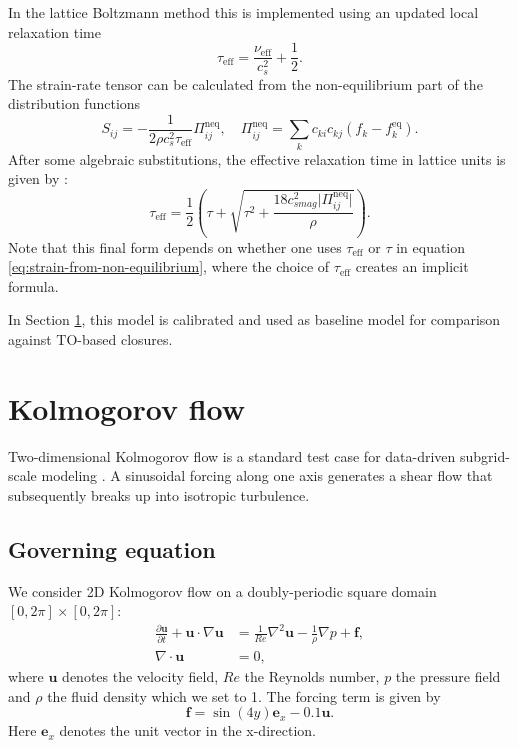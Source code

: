 \documentclass[]{elsarticle}
\begin{document}
In the lattice Boltzmann method this is implemented using an updated local relaxation time
\begin{equation}
    \tau_{\text{eff}} = \frac{\nu_{\text{eff}}}{c_s^2} + \frac{1}{2}.
\end{equation}
The strain-rate tensor can be calculated from the non-equilibrium part of the distribution functions
\begin{equation} \label{eq:strain-from-non-equilibrium}
    S_{ij} = -\frac{1}{2 \rho c_s^2 \tau_{\text{eff}}} \Pi^{\text{neq}}_{ij}, \quad \Pi^{\text{neq}}_{ij} = \sum_k c_{ki} c_{kj} (f_k - f_k^{\text{eq}}).
\end{equation}
After some algebraic substitutions, the effective relaxation time in lattice units is given by \cite{gkoudesnes_implementation_nodate}:
\begin{equation}
    \tau_{\text{eff}} = \frac{1}{2} \left( \tau + \sqrt{\tau^2 + \frac{18 c_{smag}^2 \lvert \Pi^{\text{neq}}_{ij} \rvert}{\rho}}\right).
\end{equation}
Note that this final form depends on whether one uses $\tau_{\text{eff}}$ or $\tau$ in equation \eqref{eq:strain-from-non-equilibrium}, where the choice of $\tau_{\text{eff}}$ creates an implicit formula.

In Section \ref{sec:kolmogorov-flow}, this model is calibrated and used as baseline model for comparison against TO-based closures.

\section{Kolmogorov flow}\label{sec:kolmogorov-flow}
Two-dimensional Kolmogorov flow is a standard test case for data-driven subgrid-scale modeling \cite{fischer_optimal_2025, kochkov_machine_2021, hoekstra2024Reduced_data-driven}. A sinusoidal forcing along one axis generates a shear flow that subsequently breaks up into isotropic turbulence.

\subsection{Governing equation} \label{sec:governing eqations kolmogorov flow}
We consider 2D Kolmogorov flow on a doubly-periodic square domain $[0, 2\pi] \times [0, 2\pi]$:
\begin{align}
    \frac{\partial \boldsymbol{u}}{\partial t} + \boldsymbol{u} \cdot \nabla \boldsymbol{u} &= \frac{1}{Re} \nabla^2 \boldsymbol{u} - \frac{1}{\rho} \nabla p + \boldsymbol{f}, \\
    \nabla \cdot \boldsymbol{u} &= 0,
\end{align}
where $\boldsymbol{u}$ denotes the velocity field, $Re$ the Reynolds number, $p$ the pressure field and $\rho$ the fluid density which we set to 1. The forcing term is given by
\begin{equation}
    \boldsymbol{f} = \sin(4y) \boldsymbol{e}_x - 0.1 \boldsymbol{u}.
\end{equation}
Here $\boldsymbol{e}_x$ denotes the unit vector in the x-direction. %
\end{document}
